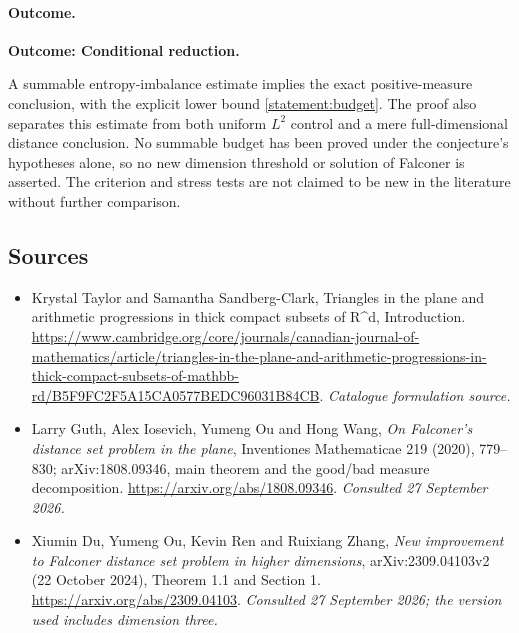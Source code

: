 \documentclass[11pt,a4paper]{article}
\begin{document}
\paragraph{Outcome.}
\textbf{Outcome: Conditional reduction.}

A summable entropy-imbalance estimate implies the exact positive-measure
conclusion, with the explicit lower bound \eqref{statement:budget}. The proof
also separates this estimate from both uniform $L^2$ control and a mere
full-dimensional distance conclusion. No summable budget has been proved
under the conjecture's hypotheses alone, so no new dimension threshold or
solution of Falconer is asserted. The criterion and stress tests are
not claimed to be new in the literature without further comparison.
\subsection{Sources}
\begin{itemize}\raggedright
\item[\textnormal{[S1]}]\hypertarget{source:statement:1}{} Krystal Taylor and Samantha Sandberg-Clark, Triangles in the plane and arithmetic progressions in thick compact subsets of R\textasciicircum{}d, Introduction.
\url{https://www.cambridge.org/core/journals/canadian-journal-of-mathematics/article/triangles-in-the-plane-and-arithmetic-progressions-in-thick-compact-subsets-of-mathbb-rd/B5F9FC2F5A15CA0577BEDC96031B84CB}.
{\small\textit{Catalogue formulation source.}}
\item[\textnormal{[E1]}]\hypertarget{extra:statement:1}{} Larry Guth, Alex Iosevich, Yumeng Ou and Hong Wang,
\emph{On Falconer's distance set problem in the plane}, Inventiones Mathematicae
219 (2020), 779--830; arXiv:1808.09346, main theorem and the good/bad measure decomposition.
\url{https://arxiv.org/abs/1808.09346}.
{\small\textit{Consulted 27 September 2026.}}
\item[\textnormal{[E2]}]\hypertarget{extra:statement:2}{} Xiumin Du, Yumeng Ou, Kevin Ren and Ruixiang Zhang,
\emph{New improvement to Falconer distance set problem in higher dimensions},
arXiv:2309.04103v2 (22 October 2024), Theorem 1.1 and Section 1.
\url{https://arxiv.org/abs/2309.04103}.
{\small\textit{Consulted 27 September 2026; the version used includes dimension three.}}
\end{itemize}
\end{document}
